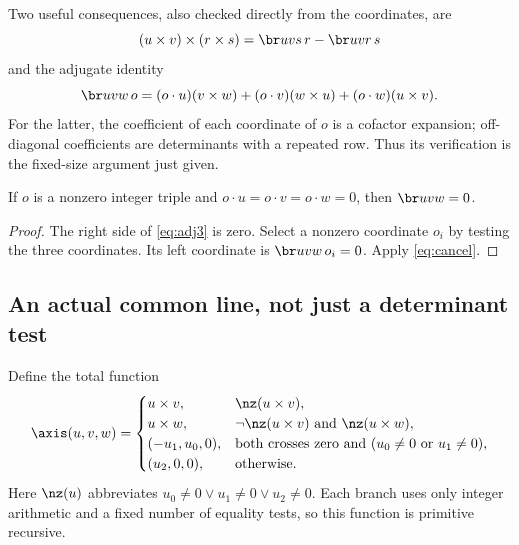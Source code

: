 Two useful consequences, also checked directly from the coordinates, are
\begin{equation}\label{eq:doublecross}
 (u\times v)\times(r\times s)=\br u v s\,r-\br u v r\,s
\end{equation}
and the adjugate identity
\begin{equation}\label{eq:adj3}
 \br u v w\,o
 =(o\cdot u)(v\times w)+(o\cdot v)(w\times u)
                         +(o\cdot w)(u\times v).
\end{equation}
For the latter, the coefficient of each coordinate of $o$ is a cofactor
expansion; off-diagonal coefficients are determinants with a repeated
row. Thus its verification is the fixed-size argument just given.

\begin{lemma}\label{lem:inc-det}
If $o$ is a nonzero integer triple and
$o\cdot u=o\cdot v=o\cdot w=0$, then $\br u v w=0$.
\end{lemma}
\begin{proof}
The right side of \eqref{eq:adj3} is zero. Select a nonzero coordinate
$o_i$ by testing the three coordinates. Its left coordinate is
$\br u v w\,o_i=0$. Apply \eqref{eq:cancel}.
\end{proof}

\subsection{An actual common line, not just a determinant test}
Define the total function
\begin{equation}\label{eq:axis}
\axis(u,v,w)=
\begin{cases}
 u\times v,&\nz(u\times v),\\
 u\times w,&\neg\nz(u\times v)\text{ and }\nz(u\times w),\\
 (-u_1,u_0,0),&\text{both crosses zero and }(u_0\ne0\text{ or }u_1\ne0),\\
 (u_2,0,0),&\text{otherwise}.
\end{cases}
\end{equation}
Here $\nz(u)$ abbreviates $u_0\ne0\lor u_1\ne0\lor u_2\ne0$.
Each branch uses only integer arithmetic and a fixed number of equality
tests, so this function is primitive recursive.

